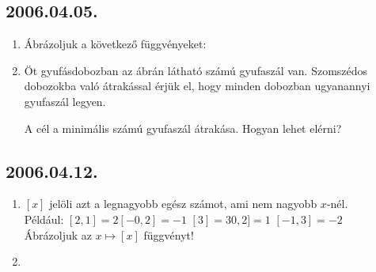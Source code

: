 \subsection*{2006.04.05.}
\begin{enumerate}
\item Ábrázoljuk a következő függvényeket:
\item Öt gyufásdobozban az ábrán látható számú gyufaszál van.
Szomszédos dobozokba való átrakással érjük el, hogy minden dobozban ugyanannyi gyufaszál legyen.
\begin{center}
\end{center}

\noindent 
 A cél a minimális számú gyufaszál átrakása. Hogyan lehet elérni?

\end{enumerate}

\subsection*{2006.04.12.}
\begin{enumerate}
\item $[x]$ jelöli azt a legnagyobb egész számot, ami nem nagyobb $x$-nél.\\ Például: 
$[2,1]=2$\quad $[-0,2]=-1$ \quad $[3]=3$\quad$0,2]=1$\quad
$[-1,3]=-2$\\
Ábrázoljuk az $x \mapsto [x]$ függvényt!
\item 
{}
\end{enumerate}

